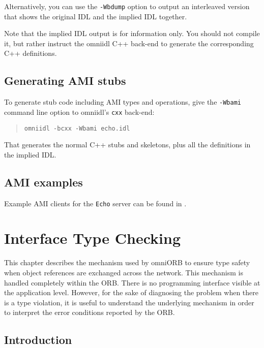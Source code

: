 \documentclass[11pt,oneside,a4paper]{book}
\newcommand{\intf}[1]{\texttt{#1}}
\newcommand{\cmdline}[1]{\texttt{#1}}
\begin{document}
\noindent Alternatively, you can use the \cmdline{-Wbdump} option to
output an interleaved version that shows the original IDL and the
implied IDL together.

Note that the implied IDL output is for information only. You should
not compile it, but rather instruct the omniidl C++ back-end to
generate the corresponding C++ definitions.


\section{Generating AMI stubs}

To generate stub code including AMI types and operations, give the
\cmdline{-Wbami} command line option to omniidl's \cmdline{cxx}
back-end:

\begin{quote}
\cmdline{omniidl -bcxx -Wbami echo.idl}
\end{quote}

\noindent That generates the normal C++ stubs and skeletons, plus all
the definitions in the implied IDL.


\section{AMI examples}

Example AMI clients for the \intf{Echo} server can be found in
.



\chapter{Interface Type Checking}
\label{ch_intf}

This chapter describes the mechanism used by omniORB to ensure type
safety when object references are exchanged across the network. This
mechanism is handled completely within the ORB. There is no
programming interface visible at the application level. However, for
the sake of diagnosing the problem when there is a type violation, it
is useful to understand the underlying mechanism in order to interpret
the error conditions reported by the ORB.

\section{Introduction}
\end{document}
